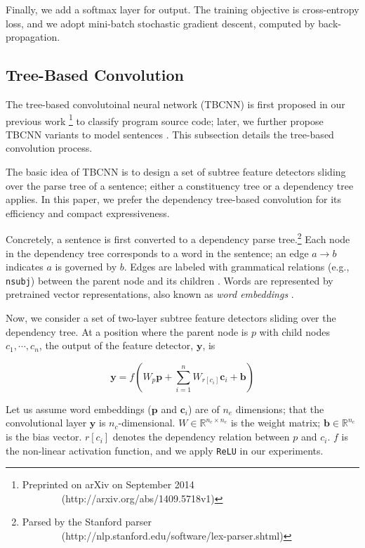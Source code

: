 \documentclass[11pt]{article}
\begin{document}
Finally, we add a softmax layer for output. The training objective is cross-entropy loss, and we adopt mini-batch stochastic gradient descent, computed by back-propagation. 


\vspace{-.1cm}
\subsection{Tree-Based Convolution}

\vspace{-.1cm}
The tree-based convolutoinal neural network (TBCNN) is first proposed in our previous work \cite{programTBCNN}\footnote{Preprinted on arXiv on September 2014\\ {\color{white}} \ \ \ \ \ \ \  \ (http://arxiv.org/abs/1409.5718v1)
} to classify program source code; later, we further propose TBCNN variants to model sentences \cite{sentenceTBCNN}. 
This subsection details the tree-based convolution process.

The basic idea of TBCNN is to design a set of subtree feature detectors sliding over the parse tree of a sentence; either a constituency tree or a dependency tree applies. In this paper, we prefer the dependency tree-based convolution for its efficiency and compact expressiveness.

Concretely, a sentence is first converted to a dependency parse tree.\footnote{Parsed by the Stanford parser\\ {\color{white}} \ \ \ \ \ \ \  \ (http://nlp.stanford.edu/software/lex-parser.shtml)
} Each node in the dependency tree corresponds to a word in the sentence; an edge $a\!\!\rightarrow\!\!b$ indicates $a$ is governed by $b$. Edges are labeled with grammatical relations (e.g., {\tt nsubj}) between the parent node and its children \cite{dependency}. Words are represented by pretrained vector representations, also known as \textit{word embeddings} \cite{word2vec}.
 
Now, we consider a set of two-layer subtree feature detectors sliding over the dependency tree. At a position where the parent node is $p$ with child nodes $c_1, \cdots, c_n$, the output of the feature detector, $\bm y$, is 

\vspace{-1.1cm}
$$\bm y=f\left(W_p \bm p + \sum_{i=1}^nW_{r[c_i]}\bm c_i+\bm b\right)$$

\vspace{-.2cm}
Let us assume word embeddings ($\bm p$ and $\bm c_i$) are of $n_e$ dimensions; that the convolutional layer $\bm y$ is $n_c$-dimensional. $W\in\mathbb{R}^{n_c\times n_e}$ is the weight matrix; $\bm b\in\mathbb{R}^{n_c}$ is the bias vector. $r[c_i]$ denotes the dependency relation between $p$ and $c_i$. $f$ is the non-linear activation function, and we apply {\tt ReLU} in our experiments.
\end{document}
